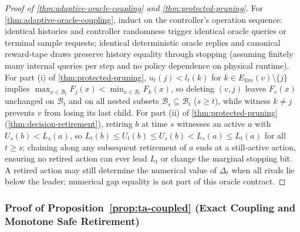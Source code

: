 \documentclass{article}
\theoremstyle{plain}
\theoremstyle{definition}
\begin{document}
\begin{proof}[Proof of \cref{thm:adaptive-oracle-coupling} and \cref{thm:protected-pruning}]
For \cref{thm:adaptive-oracle-coupling}, induct on the controller's operation sequence: identical histories and controller randomness trigger identical oracle queries or terminal sample requests; identical deterministic oracle replies and canonical reward-tape draws preserve history equality through stopping (assuming finitely many internal queries per step and no policy dependence on physical runtime). For part (i) of \cref{thm:protected-pruning}, $u_t(j)<l_t(k)$ for $k\in E_{\mathrm{live}}(v)\setminus\{j\}$ implies $\max_{x\in\mathcal B_t}F_j(x)<\min_{x\in\mathcal B_t}F_k(x)$, so deleting $(v,j)$ leaves $F_v(x)$ unchanged on $\mathcal B_t$ and on all nested subsets $\mathcal B_s\subseteq\mathcal B_t$ ($s\ge t$), while witness $k\ne j$ prevents $v$ from losing its last child. For part (ii) of \cref{thm:protected-pruning} (\cref{thm:decision-retirement}), retiring $b$ at time $s$ witnesses an active $a$ with $U_s(b)<L_s(a)$, so $L_t(b)\le U_t(b)\le U_s(b)<L_s(a)\le L_t(a)$ for all $t\ge s$; chaining along any subsequent retirement of $a$ ends at a still-active action, ensuring no retired action can ever lead $L_t$ or change the marginal
stopping bit. A retired action may still determine the numerical value of
$\Delta_t$ when all rivals lie below the leader; numerical gap equality
is not part of this oracle contract.
\end{proof}

\subsubsection{Proof of Proposition~\ref{prop:ta-coupled} (Exact Coupling and Monotone Safe Retirement)}
\end{document}
